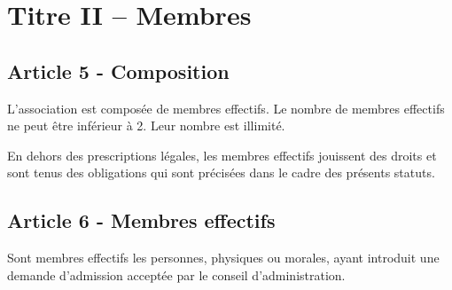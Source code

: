 \documentclass[12pt]{article}
\begin{document}

\section*{Titre II – Membres}

\subsection*{Article 5 - Composition}
L'association est composée de membres effectifs. Le nombre de membres effectifs ne peut être inférieur à 2. Leur nombre est illimité.

En dehors des prescriptions légales, les membres effectifs jouissent des droits et sont tenus des obligations qui sont précisées dans le cadre des présents statuts.

\subsection*{Article 6 - Membres effectifs}
Sont membres effectifs les personnes, physiques ou morales, ayant introduit une demande d'admission acceptée par le conseil d'administration.
\end{document}
